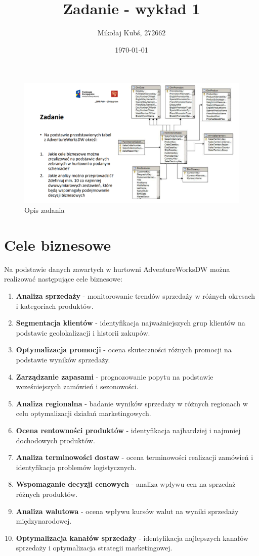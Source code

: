 \documentclass[a4paper,12pt]{article}
\title{Zadanie - wykład 1}
\author{Mikołaj Kubś, 272662}
\date{\today}
\begin{document}
\maketitle

\begin{figure}[H]
    \centering
    \includegraphics[width=1\textwidth]{images/task.png}
    \caption{Opis zadania}
\end{figure}

\section{Cele biznesowe}

Na podstawie danych zawartych w hurtowni AdventureWorksDW można realizować następujące cele biznesowe:

\begin{enumerate}
    \item \textbf{Analiza sprzedaży} - monitorowanie trendów sprzedaży w różnych okresach i kategoriach produktów.
    \item \textbf{Segmentacja klientów} - identyfikacja najważniejszych grup klientów na podstawie geolokalizacji i historii zakupów.
    \item \textbf{Optymalizacja promocji} - ocena skuteczności różnych promocji na podstawie wyników sprzedaży.
    \item \textbf{Zarządzanie zapasami} - prognozowanie popytu na podstawie wcześniejszych zamówień i sezonowości.
    \item \textbf{Analiza regionalna} - badanie wyników sprzedaży w różnych regionach w celu optymalizacji działań marketingowych.
    \item \textbf{Ocena rentowności produktów} - identyfikacja najbardziej i najmniej dochodowych produktów.
    \item \textbf{Analiza terminowości dostaw} - ocena terminowości realizacji zamówień i identyfikacja problemów logistycznych.
    \item \textbf{Wspomaganie decyzji cenowych} - analiza wpływu cen na sprzedaż różnych produktów.
    \item \textbf{Analiza walutowa} - ocena wpływu kursów walut na wyniki sprzedaży międzynarodowej.
    \item \textbf{Optymalizacja kanałów sprzedaży} - identyfikacja najlepszych kanałów sprzedaży i optymalizacja strategii marketingowej.
\end{enumerate}
\end{document}
